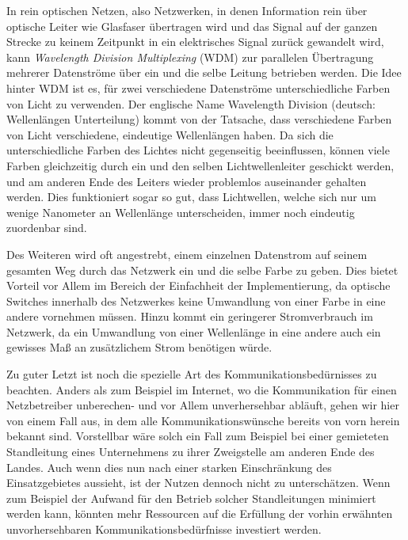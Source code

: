 In rein optischen Netzen, also Netzwerken, in denen Information rein über optische Leiter wie Glasfaser übertragen wird und das Signal auf der ganzen Strecke zu 
keinem Zeitpunkt in ein elektrisches Signal zurück gewandelt wird, kann \textit{Wavelength Division Multiplexing}
(WDM) zur parallelen Übertragung mehrerer Datenströme über ein und die selbe Leitung betrieben werden. Die Idee hinter WDM ist es, für zwei verschiedene Datenströme 
unterschiedliche Farben von Licht zu verwenden. Der englische Name Wavelength Division (deutsch: Wellenlängen Unterteilung) kommt von der Tatsache, dass 
verschiedene Farben von Licht verschiedene, eindeutige Wellenlängen haben. Da sich die unterschiedliche Farben des Lichtes nicht gegenseitig beeinflussen, können
viele Farben gleichzeitig durch ein und den selben Lichtwellenleiter geschickt werden, und am anderen Ende des Leiters wieder problemlos auseinander gehalten werden.
Dies funktioniert sogar so gut, dass Lichtwellen, welche sich nur um wenige Nanometer an Wellenlänge unterscheiden, immer noch eindeutig zuordenbar sind.

Des Weiteren wird oft angestrebt, einem einzelnen Datenstrom auf seinem gesamten Weg durch das Netzwerk ein und die selbe Farbe zu geben. Dies bietet Vorteil vor
Allem im Bereich der Einfachheit der Implementierung, da optische Switches innerhalb des Netzwerkes keine Umwandlung von einer Farbe in eine andere vornehmen müssen.
Hinzu kommt ein geringerer Stromverbrauch im Netzwerk, da ein Umwandlung von einer Wellenlänge in eine andere auch ein gewisses Maß an zusätzlichem Strom benötigen
würde.

Zu guter Letzt ist noch die spezielle Art des Kommunikationsbedürnisses zu beachten. Anders als zum Beispiel im Internet, wo die Kommunikation für einen Netzbetreiber
unberechen- und vor Allem unverhersehbar abläuft, gehen wir hier von einem Fall aus, in dem alle Kommunikationswünsche bereits von vorn herein bekannt sind. Vorstellbar
wäre solch ein Fall zum Beispiel bei einer gemieteten Standleitung eines Unternehmens zu ihrer Zweigstelle am anderen Ende des Landes. Auch wenn dies nun nach einer
starken Einschränkung des Einsatzgebietes aussieht, ist der Nutzen dennoch nicht zu unterschätzen. Wenn zum Beispiel der Aufwand für den Betrieb solcher Standleitungen
minimiert werden kann, könnten mehr Ressourcen auf die Erfüllung der vorhin erwähnten unvorhersehbaren Kommunikationsbedürfnisse investiert werden.

